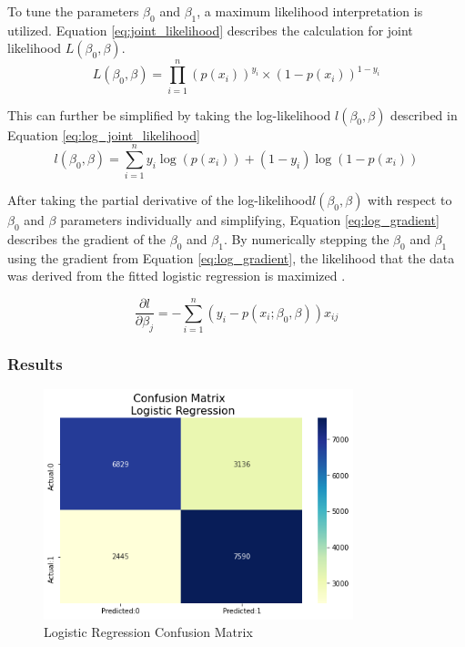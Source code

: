 To tune the parameters \(\beta_0\) and \(\beta_1\), a maximum likelihood interpretation is utilized. Equation \ref{eq:joint_likelihood} describes the calculation for joint likelihood \(L(\beta_0, \beta)\).
\begin{equation} \label{eq:joint_likelihood}
    L(\beta_0, \beta) = \prod_{i=1}^{n} \left(p(x_i)\right)^{y_i} \times \left(1-p(x_i)\right)^{1 - y_i} 
\end{equation}

\noindent
This can further be simplified by taking the log-likelihood \(l(\beta_0, \beta)\) described in Equation \ref{eq:log_joint_likelihood}
\begin{equation} \label{eq:log_joint_likelihood}
    l(\beta_0, \beta) = \sum_{i=1}^{n} y_i \log \left(p(x_i)\right) + \left(1 - y_i\right) \log \left(1-p(x_i)\right) 
\end{equation}

\noindent
After taking the partial derivative of the log-likelihood\(l(\beta_0, \beta)\) with respect to \(\beta_0\) and \(\beta\) parameters individually and simplifying, Equation \ref{eq:log_gradient} describes the gradient of the \(\beta_0\) and \(\beta_1\). By numerically stepping the \(\beta_0\) and \(\beta_1\) using the gradient from Equation \ref{eq:log_gradient}, the likelihood that the data was derived from the fitted logistic regression is maximized \citep{menard2002applied}.

\begin{equation} \label{eq:log_gradient}
    \frac{\partial l}{\partial \beta_j} = - \sum_{i=1}^{n} \left( y_i - p\left(x_i; \beta_0, \beta\right) \right) x_{ij}
\end{equation}

\subsubsection{Results}
\begin{figure}[H]
    \centering
    \includegraphics[width=90mm,height=\textheight,keepaspectratio]{images/log_conf_matrix.png}
    \caption{Logistic Regression Confusion Matrix}
    \label{fig:log_conf_matrix}
\end{figure}

